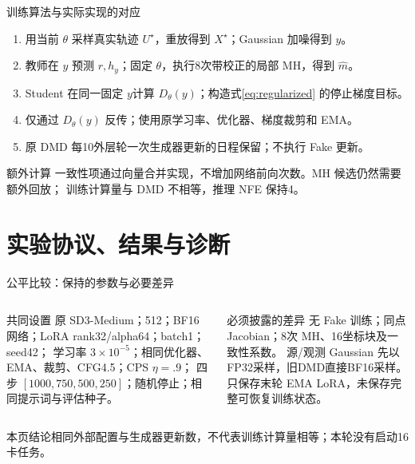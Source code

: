 \documentclass[10pt,aspectratio=169]{beamer}
\newcommand{\takeaway}[1]{\begin{exampleblock}{本页结论}\small #1\end{exampleblock}}
\begin{document}
\begin{frame}{训练算法与实际实现的对应}
\small
\begin{enumerate}\itemsep4pt
\item 用当前 $\theta$ 采样真实轨迹 $U^\star$，重放得到 $X^\star$；Gaussian 加噪得到 $y$。
\item 教师在 $y$ 预测 $r,h_y$；固定 $\theta$，执行8次带校正的局部 MH，得到 $\widehat m$。
\item Student 在\alert{同一固定 $y$}计算 $D_\theta(y)$；构造式\eqref{eq:regularized} 的停止梯度目标。
\item 仅通过 $D_\theta(y)$ 反传；使用原学习率、优化器、梯度裁剪和 EMA。
\item 原 DMD 每10外层轮一次生成器更新的日程保留；不执行 Fake 更新。
\end{enumerate}
\begin{block}{额外计算}
一致性项通过向量合并实现，不增加网络前向次数。MH 候选仍然需要额外回放；
训练计算量与 DMD 不相等，推理 NFE 保持4。
\end{block}
\end{frame}

\section{实验协议、结果与诊断}
\begin{frame}{公平比较：保持的参数与必要差异}
\small
\begin{columns}[T,onlytextwidth]
\begin{block}{共同设置}
原 SD3-Medium；512；BF16 网络；LoRA rank32/alpha64；batch1；seed42；
学习率 $3\times10^{-5}$；相同优化器、EMA、裁剪、CFG4.5；CPS $\eta=.9$；
四步 $[1000,750,500,250]$；随机停止；相同提示词与评估种子。
\end{block}
\begin{alertblock}{必须披露的差异}
无 Fake 训练；同点 Jacobian；8次 MH、16坐标块及一致性系数。
源/观测 Gaussian 先以FP32采样，旧DMD直接BF16采样。
只保存末轮 EMA LoRA，未保存完整可恢复训练状态。
\end{alertblock}
\end{columns}
\takeaway{相同外部配置与生成器更新数，不代表训练计算量相等；本轮没有启动16卡任务。}
\end{frame}
\end{document}
